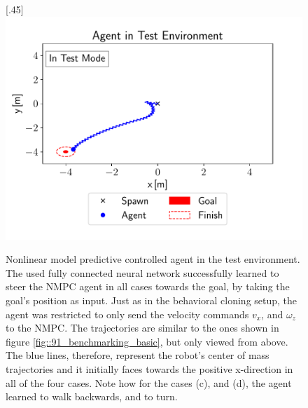 \begin{figure}[h!]
	[.45\linewidth]{\includegraphics[scale=.45]{chapters/11_autonomous_walking_experiments/img/test_mode_m4_m4.pdf}}
	\caption{Nonlinear model predictive controlled agent in the test environment. The used fully connected neural network successfully learned to steer the NMPC agent in all cases towards the goal, by taking the goal's position as input. Just as in the behavioral cloning setup, the agent was restricted to only send the velocity commands $v_x$, and $\omega_z$ to the NMPC. The trajectories are similar to the ones shown in figure \ref{fig::91_benchmarking_basic}, but only viewed from above. The blue lines, therefore, represent the robot's center of mass trajectories and it initially faces towards the positive x-direction in all of the four cases. Note how for the cases (c), and (d), the agent learned to walk backwards, and to turn.}	
	\label{fig::1122_nmpc_ppo_env}
\end{figure} 
